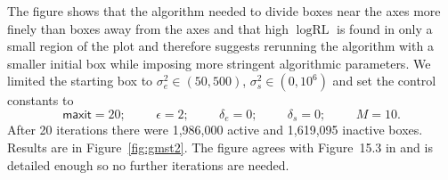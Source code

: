 \documentclass{report}
\newcommand{\textcompute}{\textsf}
\newcommand{\RLorig}{\text{RL}}
\newcommand{\logRLorig}{\log\RLorig}
\newcommand{\sigssq}{\sigma_s^2}
\newcommand{\sigesq}{\sigma_e^2}
\newcommand{\maxit}{\textcompute{maxit}}
\begin{document}
The figure shows that the algorithm needed to divide boxes near the axes more finely than boxes away from the axes and that high $\logRLorig$ is found in only a small region of the plot and therefore suggests rerunning the algorithm with a smaller initial box while imposing more stringent algorithmic parameters.  We limited the starting box to $\sigesq\in(50,500)$, $\sigssq\in(0,10^6)$ and set the control constants to 
\begin{equation*}
	\maxit=20; \hspace{1cm} \epsilon=2; \hspace{1cm}
	\delta_e=0; \hspace{1cm} \delta_s=0; \hspace{1cm} M=10.
\end{equation*}
After 20 iterations there were 1,986,000 active and 1,619,095 inactive boxes.  Results are in Figure~\ref{fig:gmst2}.  The figure agrees with Figure~15.3 in \cite{hodges:2013} and is detailed enough so no further iterations are needed.
\end{document}
